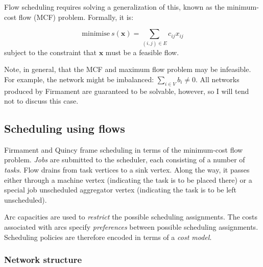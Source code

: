 Flow scheduling requires solving a generalization of this, known as the minimum-cost flow (MCF) problem. Formally, it is:

\begin{equation} \label{eq:mcf-primal-problem}
\mbox{minimise}\ s(\mathbf{x})=\sum_{(i,j)\in E}c_{ij}x_{ij}
\end{equation}
subject to the constraint that $\mathbf{x}$ must be a feasible flow.

Note, in general, that the MCF and maximum flow problem may be infeasible. For example, the network might be imbalanced: $\sum_{i\in V}b_{i}\neq0$. All networks produced by Firmament are guaranteed to be solvable, however, so I will tend not to discuss this case\footnotemark.

\subsection{Scheduling using flows} \label{sec:prep-flow-scheduling}
Firmament and Quincy frame scheduling in terms of the minimum-cost flow problem. \emph{Jobs} are submitted to the scheduler, each consisting of a number of \emph{tasks}. Flow drains from task vertices to a sink vertex. Along the way, it passes either through a machine vertex (indicating the task is to be placed there) or a special job unscheduled aggregator vertex (indicating the task is to be left unscheduled).

Arc capacities are used to \emph{restrict} the possible scheduling assignments. The costs associated with arcs specify \emph{preferences} between possible scheduling assignments. Scheduling policies are therefore encoded in terms of a \emph{cost model}.

\subsubsection{Network structure}



